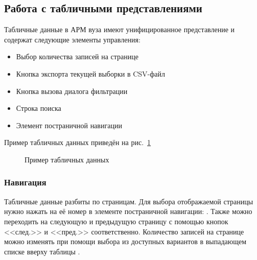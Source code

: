\graphicspath{ {images/datatables/} }
\subsection{Работа с табличными представлениями} \label{sec:datatables}

Табличные данные в АРМ вуза имеют унифицированное представление и содержат следующие элементы управления:
\begin{itemize}
	\item Выбор количества записей на странице 
	\item Кнопка экспорта текущей выборки в CSV-файл 
	\item Кнопка вызова диалога фильтрации 
	\item Строка поиска 
	\item Элемент постраничной навигации 
\end{itemize}

Пример табличных данных приведён на рис.~\ref{img:datatables:dt}

\begin{figure}[H]
	\caption{Пример табличных данных}
	\label{img:datatables:dt}
\end{figure}

\subsubsection{Навигация}

Табличные данные разбиты по страницам. Для выбора отображаемой страницы нужно нажать на её номер
в элементе постраничной навигации: . 
Также можно переходить на следующую и предыдущую страницу с помощью 
кнопок <<след.>> и <<пред.>> соответственно. Количество записей на странице можно изменять при 
помощи выбора из доступных вариантов в выпадающем списке вверху таблицы .

